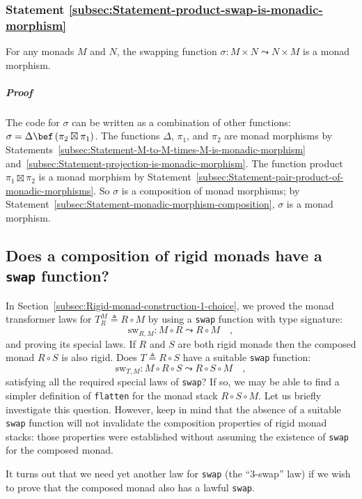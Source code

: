 \subsubsection{Statement \label{subsec:Statement-product-swap-is-monadic-morphism}\ref{subsec:Statement-product-swap-is-monadic-morphism}}

For any monads $M$ and $N$, the swapping function $\sigma:M\times N\leadsto N\times M$
is a monad morphism.

\subparagraph{Proof}

The code for $\sigma$ can be written as a combination of other functions:
$\sigma=\Delta\bef\left(\pi_{2}\boxtimes\pi_{1}\right)$. The functions
$\Delta$, $\pi_{1}$, and $\pi_{2}$ are monad morphisms by Statements~\ref{subsec:Statement-M-to-M-times-M-is-monadic-morphism}
and~\ref{subsec:Statement-projection-is-monadic-morphism}. The function
product $\pi_{1}\boxtimes\pi_{2}$ is a monad morphism by Statement~\ref{subsec:Statement-pair-product-of-monadic-morphisms}.
So $\sigma$ is a composition of monad morphisms; by Statement~\ref{subsec:Statement-monadic-morphism-composition},
$\sigma$ is a monad morphism.

\subsection{Does a composition of rigid monads have a \texttt{swap} function?\label{subsec:Does-a-composition-have-swap}}

In Section~\ref{subsec:Rigid-monad-construction-1-choice}, we proved
the monad transformer laws for $T_{R}^{M}\triangleq R\circ M$ by
using a \lstinline!swap! function with type signature:
\[
\text{sw}_{R,M}:M\circ R\leadsto R\circ M\quad,
\]
and proving its special laws. If $R$ and $S$ are both rigid monads
then the composed monad $R\circ S$ is also rigid. Does $T\triangleq R\circ S$
have a suitable \lstinline!swap! function:
\[
\text{sw}_{T,M}:M\circ R\circ S\leadsto R\circ S\circ M\quad,
\]
satisfying all the required special laws of \lstinline!swap!? If
so, we may be able to find a simpler definition of \lstinline!flatten!
for the monad stack $R\circ S\circ M$. Let us briefly investigate
this question. However, keep in mind that the absence of a suitable
\lstinline!swap! function will not invalidate the composition properties
of rigid monad stacks: those properties were established without assuming
the existence of \lstinline!swap! for the composed monad.

It turns out that we need yet another law for \lstinline!swap! (the
\textsf{``}3-swap\textsf{''} law) if we wish to prove that the composed monad also
has a lawful \lstinline!swap!. 

